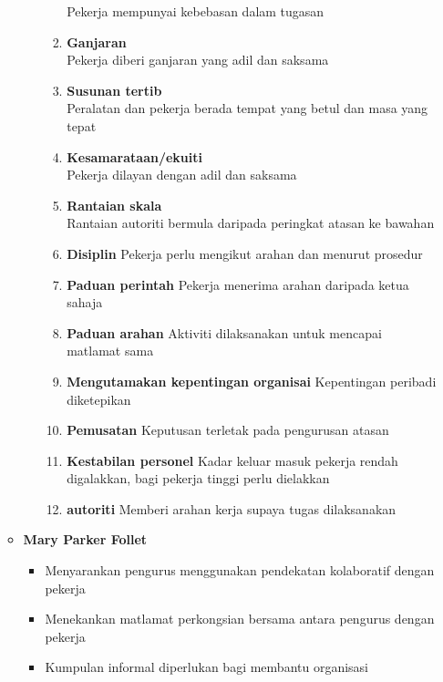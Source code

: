 \documentclass{book}
\begin{document}
\begin{multicols*}{2}
\begin{enumerate}
\begin{itemize}[leftmargin=*]
\begin{itemize}[leftmargin=*]
\begin{enumerate}[label=\arabic*, leftmargin=*]
                  Pekerja mempunyai kebebasan dalam tugasan
                \item \textbf{Ganjaran} \\
                  Pekerja diberi ganjaran yang adil dan saksama
                \item \textbf{Susunan tertib} \\
                  Peralatan dan pekerja berada tempat yang betul dan 
                  masa yang tepat
                \item \textbf{Kesamarataan/ekuiti} \\
                  Pekerja dilayan dengan adil dan saksama
                \item \textbf{Rantaian skala} \\
                  Rantaian autoriti bermula daripada peringkat atasan ke bawahan 
                \item \textbf{Disiplin}
                  Pekerja perlu mengikut arahan dan menurut prosedur
                \item \textbf{Paduan perintah}
                  Pekerja menerima arahan daripada ketua sahaja
                \item \textbf{Paduan arahan}
                  Aktiviti dilaksanakan untuk mencapai matlamat sama
                \item \textbf{Mengutamakan kepentingan organisai}
                  Kepentingan peribadi diketepikan
                \item \textbf{Pemusatan}
                  Keputusan terletak pada pengurusan atasan
                \item \textbf{Kestabilan personel}
                  Kadar keluar masuk pekerja rendah digalakkan,
                  bagi pekerja tinggi perlu dielakkan 
                \item \textbf{autoriti}
                  Memberi arahan kerja supaya tugas dilaksanakan 
              \end{enumerate}
            \end{itemize}
            \vfill\null\columnbreak
          \item \textbf{Mary Parker Follet}
            \begin{itemize}[leftmargin=*]
              \item Menyarankan pengurus menggunakan pendekatan kolaboratif dengan pekerja 
              \item Menekankan matlamat perkongsian bersama antara pengurus dengan pekerja
              \item Kumpulan informal diperlukan bagi membantu organisasi

\end{itemize}
\end{itemize}
\end{enumerate}
\end{multicols*}
\end{document}
